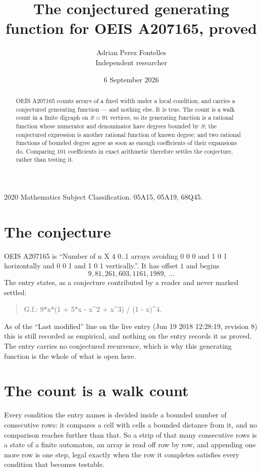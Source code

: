 \documentclass[11pt,a4paper]{article}
\title{The conjectured generating function for OEIS A207165, proved}
\author{Adrian Perez Fontelles\\ \small Independent researcher}
\date{6 September 2026}
\theoremstyle{plain}
\theoremstyle{definition}
\begin{document}
\maketitle

\begin{abstract}
OEIS A207165 counts arrays of a fixed width under a local condition, and carries a conjectured
generating function --- and nothing else. It is true. The count is a walk count in a finite
digraph on $S=91$ vertices, so its generating function is a rational function whose numerator
and denominator have degrees bounded by $S$; the conjectured expression is another rational
function of known degree; and two rational functions of bounded degree agree as soon as enough
coefficients of their expansions do. Comparing $101$ coefficients in exact arithmetic
therefore settles the conjecture, rather than testing it.
\end{abstract}

\noindent\small 2020 Mathematics Subject Classification. 05A15, 05A19, 68Q45.\normalsize

\section{The conjecture}

OEIS A207165 is ``Number of n X 4 0..1 arrays avoiding 0 0 0 and 1 0 1 horizontally and 0 0 1 and 1 0 1 vertically.''. It has offset $1$ and begins
\[
9, 81, 261, 603, 1161, 1989,\ \dots
\]
The entry states, as a conjecture contributed by a reader and never marked settled:
\begin{quote}
G.f.: 9*x*(1 + 5*x - x\^{}2 + x\^{}3) / (1 - x)\^{}4.
\end{quote}
As of the ``Last modified'' line on the live entry (Jun 19 2018 12:28:19, revision 8) this is still
recorded as empirical, and nothing on the entry records it as proved. The entry carries no
conjectured recurrence, which is why this generating function is the whole of what is open
here.

\section{The count is a walk count}

Every condition the entry names is decided inside a bounded number of consecutive rows: it
compares a cell with cells a bounded distance from it, and no comparison reaches further than
that. So a strip of that many consecutive rows is a state of a finite automaton, an array is
read off row by row, and appending one more row is one step, legal exactly when the row it
completes satisfies every condition that becomes testable.
\end{document}
